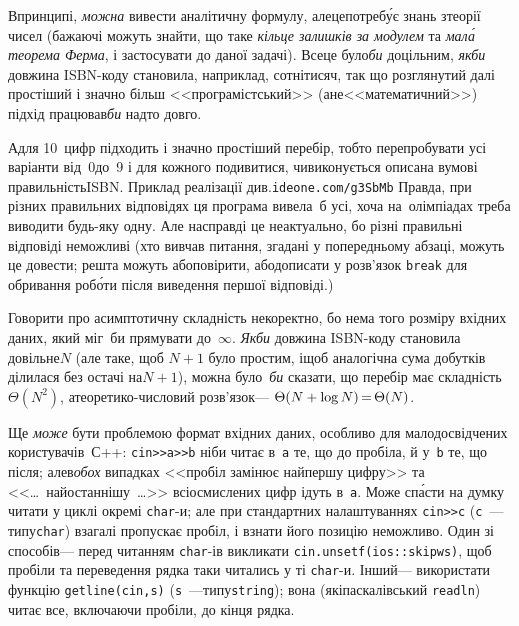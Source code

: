 \Tutorial	В\nolinebreak[3] принципі, \emph{можна} вивести аналітичну формулу, але\nolinebreak[2] це\nolinebreak[1] потреб\'{у}є знань з\nolinebreak[3] теорії чисел (бажаючі можуть знайти, що таке \emph{кільце залишків за модулем} та \emph{мал\'{а} теорема Ферма}, і застосувати до даної задачі). Все\nolinebreak[3] це було\nolinebreak[3] \emph{би} доцільним, \emph{якби} довжина ISBN-коду становила, наприклад, \mbox{сотні}\nolinebreak[1] \mbox{тисяч}, так що розглянутий далі простіший і значно більш <<програмістський>> (а\nolinebreak[3] не\nolinebreak[3] <<математичний>>) підхід працював\nolinebreak[3] \emph{би} надто довго.

А\nolinebreak[3] для 10~цифр підходить і значно простіший перебір, тобто перепробувати усі варіанти від~0\nolinebreak[1] до~9 і для кожного подивитися, чи\nolinebreak[3] виконується описана в\nolinebreak[3] умові правильність\nolinebreak[3] ISBN. Приклад реалізації див.\nolinebreak[1] \verb"ideone.com/g3SbMb"\hspace{0.5em plus 1em} Правда, при різних правильних відповідях ця програма вивела~б усі, хоча на~олімпіадах треба виводити будь-яку одну. Але насправді це неактуально, бо різні правильні відповіді неможливі (хто вивчав питання, згадані у попередньому абзаці, можуть це довести; решта можуть або\nolinebreak[3] повірити, або\nolinebreak[3] дописати у розв'язок \verb"break" для обривання роб\'{о}ти після виведення першої відповіді.)

Говорити про асимптотичну складність некоректно, бо нема того розміру вхідних даних, який міг~би прямувати до~$\infty$. \emph{Якби} довжина ISBN-коду становила довільне\nolinebreak[3] $N$ (але таке, щоб $N{+}1$ було простим, і\nolinebreak[3] щоб аналогічна сума добутків ділилася без остачі на\nolinebreak[2] $N{+}1$), можна було~\emph{би} сказати, що перебір має складність\nolinebreak[3] $\Theta(N^2)$, а\nolinebreak[3] теоретико-числовий розв'язок\nolinebreak[3] --- ${\Theta(N+\log{}N)}\dib{{=}}{\Theta(N)}$.

Ще \emph{може} бути проблемою формат вхідних даних, особливо для малодосвідчених користувачів~\mbox{С++}: \verb"cin>>a>>b" ніби читає в~\verb"a" те, що до пробіла, й у~\verb"b" те, що після; але\nolinebreak[3] в\nolinebreak[2] \emph{обох} випадках <<пробіл замінює найпершу цифру>> та <<\dots~найостаннішу~\dots>> всі\nolinebreak[1] осмислених цифр ідуть в~\verb"a". Може сп\'{а}сти на думку читати у циклі окремі \mbox{\verb"char"-и}; але при стандартних налаштуваннях \verb"cin>>c" (\verb"c"~---\nolinebreak[1] типу\nolinebreak[2] \verb"char") взагалі пропускає пробіл, і взнати його позицію неможливо. Один зі способів\nolinebreak[3] --- перед читанням \mbox{\verb"char"-ів} викликати %
\verb"cin.unsetf(ios::skipws)", щоб пробіли та переведення рядка таки читались у ті \mbox{\verb"char"-и}. Інший\nolinebreak[3] --- використати функцію \verb"getline(cin,s)" (\verb"s"~---\nolinebreak[1] типу\nolinebreak[1] \verb"string"); вона (як\nolinebreak[2] і\nolinebreak[2] паскалівський \verb"readln") читає все, включаючи пробіли, до кінця рядка.


